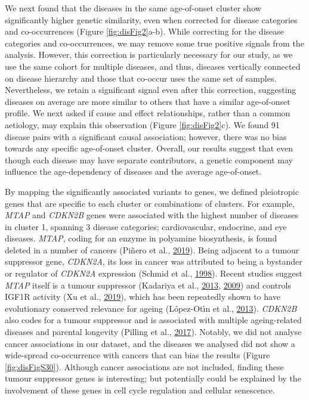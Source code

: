 \documentclass[12pt,twoside]{unicam}
\begin{document}
We next found that the diseases in the same age-of-onset cluster show significantly higher genetic similarity, even when corrected for disease categories and co-occurrences (Figure \ref{fig:disFig2}a-b). While correcting for the disease categories and co-occurrences, we may remove some true positive signals from the analysis. However, this correction is particularly necessary for our study, as we use the same cohort for multiple diseases, and thus, diseases vertically connected on disease hierarchy and those that co-occur uses the same set of samples. Nevertheless, we retain a significant signal even after this correction, suggesting diseases on average are more similar to others that have a similar age-of-onset profile. We next asked if cause and effect relationships, rather than a common aetiology, may explain this observation (Figure \ref{fig:disFig2}c). We found 91 disease pairs with a significant causal association; however, there was no bias towards any specific age-of-onset cluster. Overall, our results suggest that even though each disease may have separate contributors, a genetic component may influence the age-dependency of diseases and the average age-of-onset.

By mapping the significantly associated variants to genes, we defined pleiotropic genes that are specific to each cluster or combinations of clusters. For example, \emph{MTAP} and \emph{CDKN2B} genes were associated with the highest number of diseases in cluster 1, spanning 3 disease categories; cardiovascular, endocrine, and eye diseases. \emph{MTAP}, coding for an enzyme in polyamine biosynthesis, is found deleted in a number of cancers (Piñero et al., \protect\hyperlink{ref-Pinero2019}{2019}). Being adjacent to a tumour suppressor gene, \emph{CDKN2A}, its loss in cancer was attributed to being a bystander or regulator of \emph{CDKN2A} expression (Schmid et al., \protect\hyperlink{ref-Schmid1998}{1998}). Recent studies suggest \emph{MTAP} itself is a tumour suppressor (Kadariya et al., \protect\hyperlink{ref-Kadariya2013}{2013}, \protect\hyperlink{ref-Kadariya2009}{2009}) and controls IGF1R activity (Xu et al., \protect\hyperlink{ref-Xu2019}{2019}), which has been repeatedly shown to have evolutionary conserved relevance for ageing (López-Otı́n et al., \protect\hyperlink{ref-Lopez-Otin2013}{2013}). \emph{CDKN2B} also codes for a tumour suppressor and is associated with multiple ageing-related diseases and parental longevity (Pilling et al., \protect\hyperlink{ref-Pilling2017}{2017}). Notably, we did not analyse cancer associations in our dataset, and the diseases we analysed did not show a wide-spread co-occurrence with cancers that can bias the results (Figure \ref{fig:disFigS30}). Although cancer associations are not included, finding these tumour suppressor genes is interesting; but potentially could be explained by the involvement of these genes in cell cycle regulation and cellular senescence.
\end{document}
